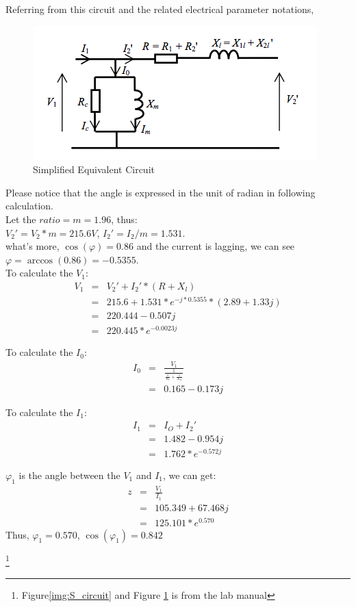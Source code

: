 \documentclass[11pt]{scrartcl}
\begin{document}
\FloatBarrier
Referring from this circuit and the related electrical parameter notations,
\begin{figure}[h!]
\centering
\includegraphics[scale=0.8]{circuit.png}
\caption{Simplified Equivalent Circuit}
\label{img:cal}
\end{figure}
\FloatBarrier
Please notice that the angle is expressed in the unit of radian in following calculation.\\

Let the $ratio = m = 1.96$, thus:\\

$V_2' = V_2 * m = 215.6 V$, $I_2' = I_2/ m= 1.531$.\\

 what's more, $\cos(\varphi) = 0.86$ and the current is lagging, we can see $ \varphi = \arccos(0.86) = -0.5355$.\\
 
To calculate the $V_1$:
\begin{eqnarray*}
V_1 &=& V_2' + I_2' *(R + X_l)\\
 &=& 215.6 + 1.531*e^{-j*0.5355}*(2.89+1.33j)\\
 &=&220.444-0.507j\\
 &=&220.445*e^{-0.0023j}
\end{eqnarray*}

To calculate the $I_0$:
\begin{eqnarray*}
I_0 &=& \frac{V_1}{\frac{1}{\frac{1}{R_c}+\frac{1}{X_m}}}\\
&=& 0.165 - 0.173j
\end{eqnarray*}

To calculate the $I_1$:
\begin{eqnarray*}
I_1 &=& I_O + I_2'\\
&=& 1.482 - 0.954j\\
&=& 1.762*e^{-0.572j}
\end{eqnarray*}

$\varphi_1$ is the angle between the $V_1$ and $I_1$, we can get:
\begin{eqnarray*}
z &=& \frac{V_1}{I_1}\\
&=& 105.349+67.468j\\
&=& 125.101*e^{0.570}
\end{eqnarray*}
Thus, $\varphi_1 = 0.570$, $\cos(\varphi_1) = 0.842$


\footnote{Figure\ref{img:S_circuit} and Figure \ref{img:cal} is from the lab manual}
\end{document}
